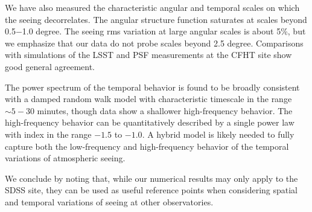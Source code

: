 We have also measured the characteristic angular and temporal scales on which 
the seeing decorrelates. The angular structure function saturates at scales beyond 
0.5$-$1.0 degree. The seeing rms variation at large angular scales is about 5\%,
but we emphasize that our data do not probe scales beyond 2.5 degree. Comparisons 
with simulations of the LSST and PSF measurements at the CFHT site show good general 
agreement.

The power spectrum of the temporal behavior is found to be broadly consistent with 
a damped random walk model with characteristic timescale in the range $\sim5-30$ 
minutes, though data show a shallower high-frequency behavior. The high-frequency 
behavior can be quantitatively described by a single power law with index in the 
range $-1.5$ to $-1.0$. A hybrid model is likely needed to fully capture both the 
low-frequency and high-frequency behavior of the temporal variations of atmospheric
seeing. 

We conclude by noting that, while our numerical results may only apply to the SDSS 
site, they can be used as useful reference points when considering spatial and 
temporal variations of seeing at other observatories.
